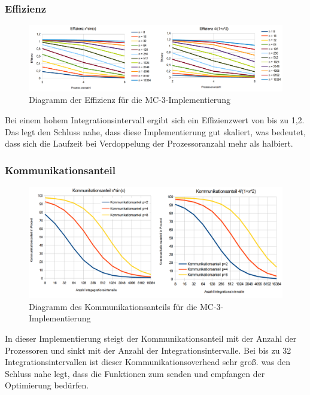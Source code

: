 \documentclass[a4paper,12pt]{scrartcl}
\begin{document}
\subsubsection{Effizienz}
\begin{figure}[htb]
  \begin{center}
    \includegraphics[width=1\hsize]{../mc3_effizienz.png}
  \end{center}
  \caption{\label{mc3effizienz}
    Diagramm der Effizienz f\"ur die MC-3-Implementierung}
\end{figure}
Bei einem hohem Integrationsintervall ergibt sich ein Effizienzwert von bis zu 1,2. Das legt den Schluss nahe, dass diese Implementierung gut skaliert, was
bedeutet, dass sich die Laufzeit bei Verdoppelung der Prozessoranzahl mehr als halbiert.

\subsubsection{Kommunikationsanteil}
\begin{figure}[htb]
  \begin{center}
    \includegraphics[width=1\hsize]{../mc3_kommunikationsanteil.png}
  \end{center}
  \caption{\label{mc3kommanteil}
    Diagramm des Kommunikationsanteils f\"ur die MC-3-Implementierung}
\end{figure}
In dieser Implementierung steigt der Kommunikationsanteil mit der Anzahl der Prozessoren und sinkt mit der Anzahl der Integrationsintervalle.
Bei bis zu 32 Integrationsintervallen ist dieser Kommunikationsoverhead sehr gro\ss{}. was den Schluss nahe legt, dass die Funktionen zum senden und empfangen
der Optimierung bed\"urfen.\\
\end{document}
